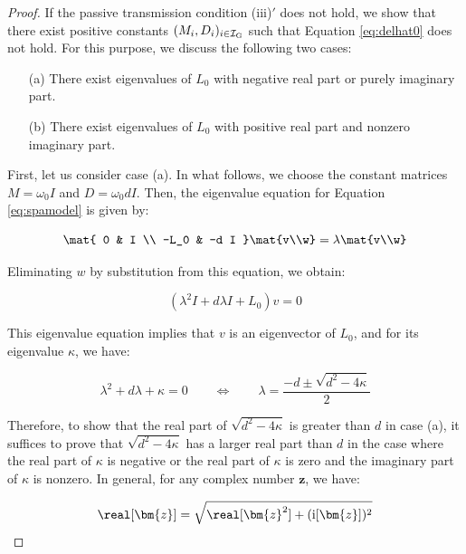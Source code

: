 \documentclass[graybox, envcountchap]{svmult}
\begin{document}
\begin{proof}
If the passive transmission condition (iii)$'$ does not hold, we show that there
exist positive constants $(M_i,D_i)_{i \in \mathcal{I}_{\rm G}}$ such that
Equation \ref{eq:delhat0} does not hold. For this purpose, we discuss the
following two cases:
\begin{itemize}
  \item[(a)] There exist eigenvalues of $L_0$ with negative real part or purely imaginary part.
  \item[(b)] There exist eigenvalues of $L_0$ with positive real part and nonzero imaginary part.
\end{itemize}

First, let us consider case (a). In what follows, we choose the constant
matrices $M =\omega_0 I$ and $D = \omega_0 dI$. Then, the eigenvalue equation
for Equation \ref{eq:spamodel} is given by:

\begin{equation*}
  \mat{
  0 & I \\
  -L_0 & -d I
  }
  \mat{v\\w}
  =
  \lambda \mat{v\\w}
\end{equation*}

Eliminating $w$ by substitution from this equation, we obtain:

\begin{equation*}
  \left(\lambda^2 I +d \lambda I + L_0
  \right) v =0
\end{equation*}

This eigenvalue equation implies that $v$ is an eigenvector of $L_0$, and for
its eigenvalue $\kappa$, we have:

\begin{equation}\label{eq:lamsq}
  \lambda^2 + d\lambda +\kappa =0
  \qquad
  \Longleftrightarrow
  \qquad
  \lambda = \frac{-d \pm \sqrt{d^2-4\kappa} }{2}
\end{equation}

Therefore, to show that the real part of $\sqrt{d^2 - 4\kappa}$ is greater than
$d$ in case (a), it suffices to prove that $\sqrt{d^2 - 4\kappa}$ has a larger
real part than $d$ in the case where the real part of $\kappa$ is negative or
the real part of $\kappa$ is zero and the imaginary part of $\kappa$ is nonzero.
In general, for any complex number $\bm{z}$, we have:

\begin{equation*}
  \real[\bm{z}] = \sqrt{ \real[\bm{z}^2 ] + (\imag[\bm{z}])^2 }
\end{equation*}


\end{proof}
\end{document}
